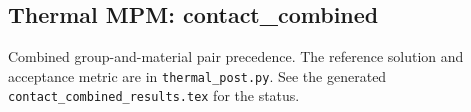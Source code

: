 \subsection{Thermal MPM: contact\_combined}
Combined group-and-material pair precedence. The reference solution and acceptance metric are in \texttt{thermal\_post.py}. See the generated \texttt{contact\_combined\_results.tex} for the status.
